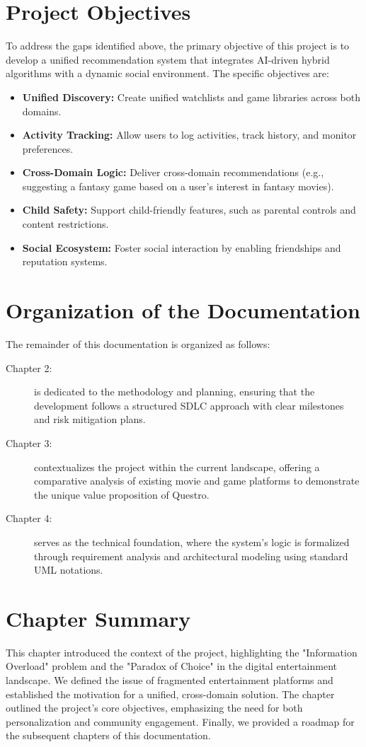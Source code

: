 \section{Project Objectives}
To address the gaps identified above, the primary objective of this project is to develop a unified recommendation system that integrates AI-driven hybrid algorithms with a dynamic social environment. The specific objectives are:
\begin{itemize}
    \item \textbf{Unified Discovery:} Create unified watchlists and game libraries across both domains.
    \item \textbf{Activity Tracking:} Allow users to log activities, track history, and monitor preferences.
    \item \textbf{Cross-Domain Logic:} Deliver cross-domain recommendations (e.g., suggesting a fantasy game based on a user’s interest in fantasy movies).
    \item \textbf{Child Safety:} Support child-friendly features, such as parental controls and content restrictions.
    \item \textbf{Social Ecosystem:} Foster social interaction by enabling friendships and reputation systems.
\end{itemize}

\section{Organization of the Documentation}

The remainder of this documentation is organized as follows:

\begin{description}
    \item[Chapter 2:] is dedicated to the methodology and planning, ensuring that the development follows a structured SDLC approach with clear milestones and risk mitigation plans.
    
    \item[Chapter 3:] contextualizes the project within the current landscape, offering a comparative analysis of existing movie and game platforms to demonstrate the unique value proposition of Questro.
    
    \item[Chapter 4:] serves as the technical foundation, where the system's logic is formalized through requirement analysis and architectural modeling using standard UML notations.
\end{description}
\newpage
\section{Chapter Summary}
This chapter introduced the context of the project, highlighting the "Information Overload" problem and the "Paradox of Choice" in the digital entertainment landscape. We defined the issue of fragmented entertainment platforms and established the motivation for a unified, cross-domain solution. The chapter outlined the project's core objectives, emphasizing the need for both personalization and community engagement. Finally, we provided a roadmap for the subsequent chapters of this documentation.